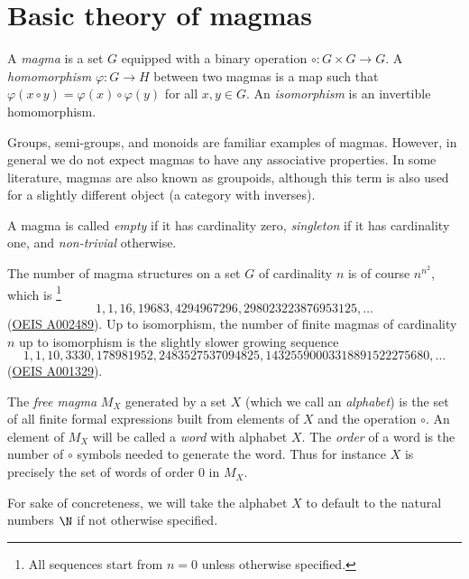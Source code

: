\chapter{Basic theory of magmas}

\begin{definition}[Magma]\label{magma-def}\leanok A \emph{magma} is a set $G$ equipped with a binary operation $\circ: G \times G \to G$.  A \emph{homomorphism} $\varphi : G \to H$ between two magmas is a map such that $\varphi(x \circ y) = \varphi(x) \circ \varphi(y)$ for all $x,y \in G$.  An \emph{isomorphism} is an invertible homomorphism.
\end{definition}

Groups, semi-groups, and monoids are familiar examples of magmas.  However, in general we do not expect magmas to have any associative properties.  In some literature, magmas are also known as groupoids, although this term is also used for a slightly different object (a category with inverses).

A magma is called \emph{empty} if it has cardinality zero, \emph{singleton} if it has cardinality one, and \emph{non-trivial} otherwise.

The number of magma structures on a set $G$ of cardinality $n$ is of course $n^{n^2}$, which is \footnote{All sequences start from $n=0$ unless otherwise specified.}
$$ 1, 1, 16, 19683, 4294967296, 298023223876953125, \dots$$
(\href{https://oeis.org/A002489}{OEIS A002489}).
Up to isomorphism, the number of finite magmas of cardinality $n$ up to isomorphism is the slightly slower growing sequence
$$ 1, 1, 10, 3330, 178981952, 2483527537094825, 14325590003318891522275680, \dots$$
(\href{https://oeis.org/A001329}{OEIS A001329}).

\begin{definition}\label{free-magma-def}\leanok{} The \emph{free magma} $M_X$ generated by a set $X$ (which we call an \emph{alphabet}) is the set of all finite formal expressions built from elements of $X$ and the operation $\circ$.  An element of $M_X$ will be called a \emph{word} with alphabet $X$.  The \emph{order} of a word is the number of $\circ$ symbols needed to generate the word.  Thus for instance $X$ is precisely the set of words of order $0$ in $M_X$.
\end{definition}

For sake of concreteness, we will take the alphabet $X$ to default to the natural numbers $\N$ if not otherwise specified.

